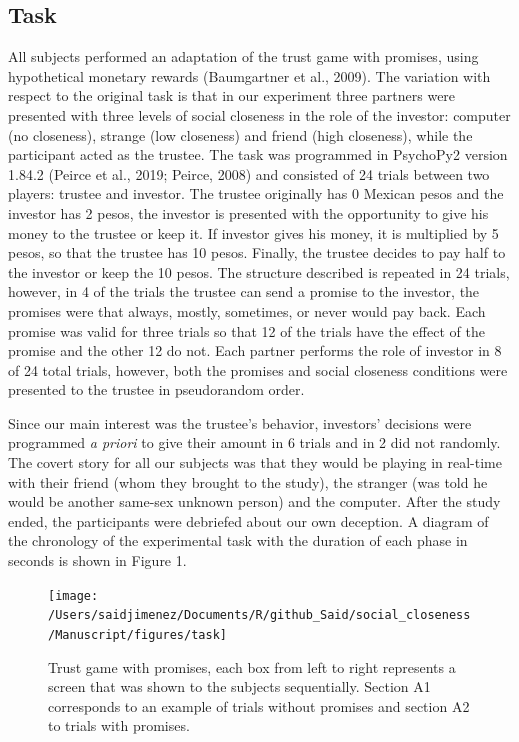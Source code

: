 \documentclass[12pt,]{article}
\begin{document}
\hypertarget{task}{%
\subsection{Task}\label{task}}

All subjects performed an adaptation of the trust game with promises,
using hypothetical monetary rewards (Baumgartner et al., 2009). The
variation with respect to the original task is that in our experiment
three partners were presented with three levels of social closeness in
the role of the investor: computer (no closeness), strange (low
closeness) and friend (high closeness), while the participant acted as
the trustee. The task was programmed in PsychoPy2 version 1.84.2 (Peirce
et al., 2019; Peirce, 2008) and consisted of 24 trials between two
players: trustee and investor. The trustee originally has 0 Mexican
pesos and the investor has 2 pesos, the investor is presented with the
opportunity to give his money to the trustee or keep it. If investor
gives his money, it is multiplied by 5 pesos, so that the trustee has 10
pesos. Finally, the trustee decides to pay half to the investor or keep
the 10 pesos. The structure described is repeated in 24 trials, however,
in 4 of the trials the trustee can send a promise to the investor, the
promises were that always, mostly, sometimes, or never would pay back.
Each promise was valid for three trials so that 12 of the trials have
the effect of the promise and the other 12 do not. Each partner performs
the role of investor in 8 of 24 total trials, however, both the promises
and social closeness conditions were presented to the trustee in
pseudorandom order.

Since our main interest was the trustee's behavior, investors' decisions
were programmed \emph{a priori} to give their amount in 6 trials and in
2 did not randomly. The covert story for all our subjects was that they
would be playing in real-time with their friend (whom they brought to
the study), the stranger (was told he would be another same-sex unknown
person) and the computer. After the study ended, the participants were
debriefed about our own deception. A diagram of the chronology of the
experimental task with the duration of each phase in seconds is shown in
Figure 1.

\begin{figure}

{\centering \texttt{[image: /Users/saidjimenez/Documents/R/github\_Said/social\_closeness/Manuscript/figures/task]} 

}

\caption{Trust game with promises, each box from left to right represents a screen that was shown to the subjects sequentially. Section A1 corresponds to an example of trials without promises and section A2 to trials with promises.}\label{fig:figA}
\end{figure}
\end{document}
